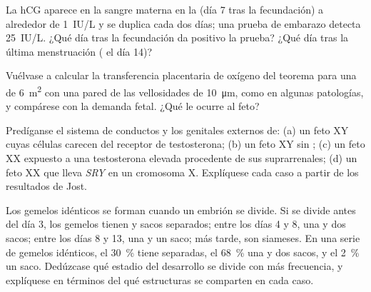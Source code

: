 \begin{exercise}[$\star\star$]\label{exo:b2:mammal-reproduction:8}
La hCG aparece en la sangre materna en la  (día 7 tras la
fecundación) a alrededor de \qty{1}{IU/L} y se duplica cada dos días;
una prueba de embarazo detecta \qty{25}{IU/L}. ¿Qué día tras la
fecundación da positivo la prueba? ¿Qué día tras la última menstruación
( el día 14)?
\end{exercise}

\begin{exercise}[$\star\star$]\label{exo:b2:mammal-reproduction:9}
Vuélvase a calcular la transferencia placentaria de oxígeno del teorema
para una  de \qty{6}{m^2} con una pared de las vellosidades de
\qty{10}{\micro m}, como en algunas patologías, y compárese con la demanda
fetal. ¿Qué le ocurre al feto?
\end{exercise}

\begin{exercise}[$\star\star\star$]\label{exo:b2:mammal-reproduction:10}
Predíganse el sistema de conductos y los genitales externos de: (a) un
feto XY cuyas células carecen del receptor de testosterona; (b) un feto
XY sin ; (c) un feto XX expuesto a una testosterona
elevada procedente de sus suprarrenales; (d) un feto XX que lleva
\emph{SRY} en un cromosoma X. Explíquese cada caso a partir de los
resultados de Jost.
\end{exercise}

\begin{exercise}[$\star\star\star$]\label{exo:b2:mammal-reproduction:11}
Los gemelos idénticos se forman cuando un embrión se divide. Si se divide
antes del día 3, los gemelos tienen  y sacos separados; entre
los días 4 y 8, una  y dos sacos; entre los días 8 y 13, una
 y un saco; más tarde, son siameses. En una serie de gemelos
idénticos, el \qty{30}{\%} tiene  separadas, el \qty{68}{\%} una
 y dos sacos, y el \qty{2}{\%} un saco. Dedúzcase qué estadio del
desarrollo se divide con más frecuencia, y explíquese en términos del
 qué estructuras se comparten en cada caso.
\end{exercise}

